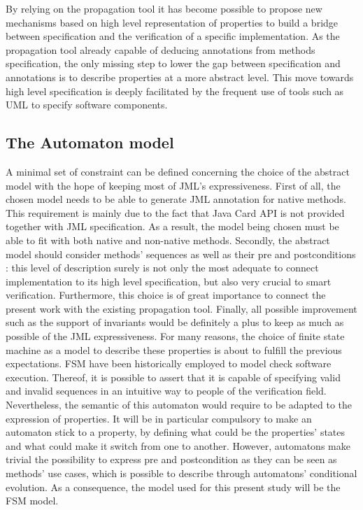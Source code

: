 By relying on the propagation tool it has become possible to propose new mechanisms based on high level representation of properties to build a bridge between specification and the verification of a specific implementation. As the propagation tool already capable of deducing annotations from methods specification, the only missing step to lower the gap between specification and annotations is to describe properties at a more abstract level. This move towards high level specification is deeply facilitated by the frequent use of tools such as UML to specify software components.

\subsection{The Automaton model}
A minimal set of constraint can be defined concerning the choice of the abstract model with the hope of keeping most of JML's expressiveness. First of all, the chosen model needs to be able to generate JML annotation for native methods. This requirement is mainly due to the fact that Java Card API is not provided together with JML specification. As a result, the model being chosen must be able to fit with both native and non-native methods. Secondly, the abstract model should consider methods' sequences as well as their pre and postconditions : this level of description surely is not only the most adequate to connect implementation to its high level specification, but also very crucial to smart verification. Furthermore, this choice is of great importance to connect the present work with the existing propagation tool. Finally, all possible improvement such as the support of invariants would be definitely a plus to keep as much as possible of the JML expressiveness.
For many reasons, the choice of finite state machine as a model to describe these properties is about to fulfill the previous expectations. FSM have been historically employed to model check software execution. Thereof, it is possible to assert that it is capable of specifying valid and invalid sequences in an intuitive way to people of the verification field. Nevertheless, the semantic of this automaton would require to be adapted to the expression of properties. It will be in particular compulsory to make an automaton stick to a property, by defining what could be the properties' states and what could make it switch from one to another. However, automatons make trivial the possibility to express pre and postcondition as they can be seen as methods' use cases, which is possible to describe through automatons' conditional evolution. As a consequence, the model used for this present study will be the FSM model.

